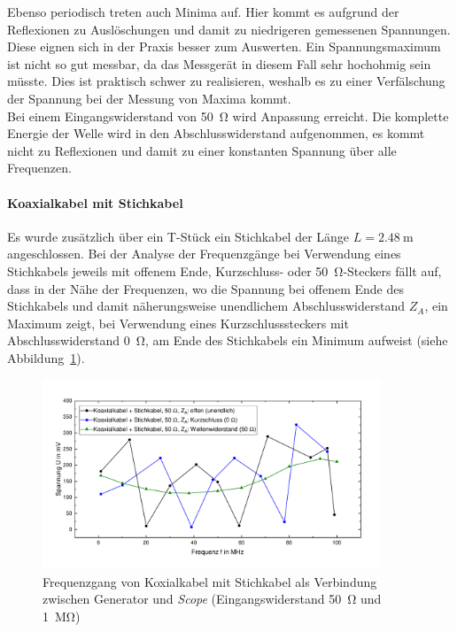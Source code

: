 \documentclass[a4paper,twoside,final]{article}
\begin{document}
Ebenso periodisch treten auch Minima auf. Hier kommt es aufgrund der Reflexionen zu Auslöschungen und damit zu niedrigeren gemessenen Spannungen. Diese eignen sich in der Praxis besser zum Auswerten. Ein Spannungsmaximum ist nicht so gut messbar, da das Messgerät in diesem Fall sehr hochohmig sein müsste. Dies ist praktisch schwer zu realisieren, weshalb es zu einer Verfälschung der Spannung bei der Messung von Maxima kommt.\\
Bei einem Eingangswiderstand von \SI{50}{\ohm} wird Anpassung erreicht. Die komplette Energie der Welle wird in den Abschlusswiderstand aufgenommen, es kommt nicht zu Reflexionen und damit zu einer konstanten Spannung über alle Frequenzen.

\paragraph{Koaxialkabel mit Stichkabel}
Es wurde zusätzlich über ein T-Stück ein Stichkabel der Länge $L=\SI{2,48}{\metre}$ angeschlossen. Bei der Analyse der Frequenzgänge bei Verwendung eines Stichkabels jeweils mit offenem Ende, Kurzschluss- oder \SI{50}{\ohm}-Steckers fällt auf, dass in der Nähe der Frequenzen, wo die Spannung bei offenem Ende des Stichkabels und damit näherungsweise unendlichem Abschlusswiderstand $Z_A$, ein Maximum zeigt, bei Verwendung eines Kurzschlusssteckers mit Abschlusswiderstand \SI{0}{\ohm}, am Ende des Stichkabels ein Minimum aufweist (siehe Abbildung~\ref{fig:Frequenzgang_Koaxialkabel_Stichkabel}).
\begin{figure}[htp]
    \centering
        \vspace{-0.5cm}
        \includegraphics[width=0.9\textwidth]{Bilder/Koaxialkabel_Stichkabel.pdf}
        \vspace{-0.25cm}
    \caption{Frequenzgang von Koxialkabel mit Stichkabel als Verbindung zwischen Generator und \textit{Scope} (Eingangswiderstand \SI{50}{\ohm} und \SI{1}{\mega\ohm}) }
    \label{fig:Frequenzgang_Koaxialkabel_Stichkabel}
\end{figure}\\
\end{document}
